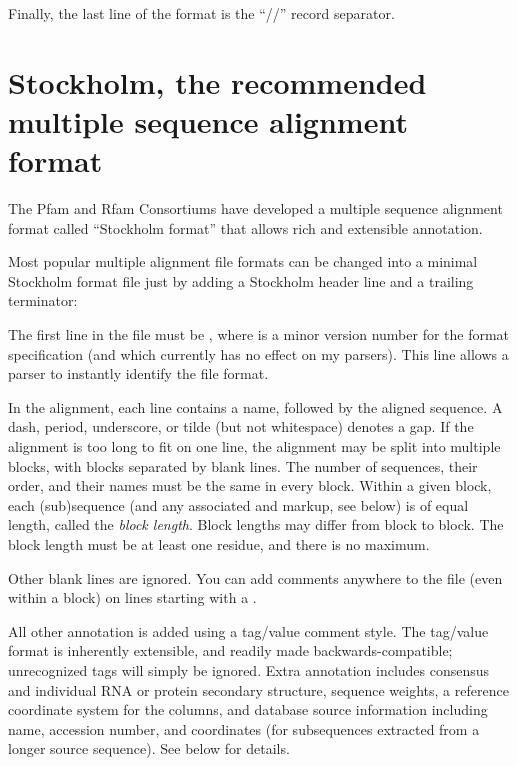 Finally, the last line of the format is the ``//'' record separator.

\newpage
\section{Stockholm, the recommended multiple sequence alignment format}
\label{section:stockholm}

The Pfam and Rfam Consortiums have developed a multiple sequence
alignment format called ``Stockholm format'' that allows rich and
extensible annotation. 

Most popular multiple alignment file formats can be changed into a
minimal Stockholm format file just by adding a Stockholm header line
and a trailing \mono{//} terminator:


The first line in the file must be , where
 is a minor version number for the format specification (and
which currently has no effect on my parsers). This line allows a
parser to instantly identify the file format.

In the alignment, each line contains a name, followed by the aligned
sequence. A dash, period, underscore, or tilde (but not whitespace)
denotes a gap. If the alignment is too long to fit on one line, the
alignment may be split into multiple blocks, with blocks separated by
blank lines. The number of sequences, their order, and their names
must be the same in every block. Within a given block, each
(sub)sequence (and any associated  and  markup,
see below) is of equal length, called the \emph{block length}. Block
lengths may differ from block to block. The block length must be at
least one residue, and there is no maximum.

Other blank lines are ignored. You can add comments anywhere to the
file (even within a block) on lines starting with a \mono{\#}.

All other annotation is added using a tag/value comment style. The
tag/value format is inherently extensible, and readily made
backwards-compatible; unrecognized tags will simply be ignored. Extra
annotation includes consensus and individual RNA or protein secondary
structure, sequence weights, a reference coordinate system for the
columns, and database source information including name, accession
number, and coordinates (for subsequences extracted from a longer
source sequence). See below for details.

